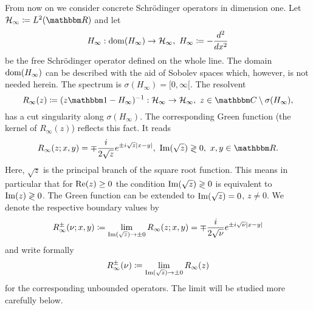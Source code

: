 From now on we consider concrete Schr\"odinger operators in dimension one.
Let $\hilbert_\infty\coloneqq L^2(\R)$ and let 
\begin{equation}\label{H_infinity}
  H_\infty:\operatorname{dom}(H_\infty)\to{\mathcal H}_\infty,\ H_\infty \coloneqq -\frac{d^2}{dx^2}
\end{equation}
be the free Schr\"odinger operator defined on the whole line. The domain $\operatorname{dom}(H_\infty)$ can be described
with the aid of Sobolev spaces which, however, is not needed herein.
The spectrum is $\sigma(H_\infty)=[0,\infty[$. The resolvent
\begin{equation}\label{R_infinity}
  R_\infty(z)\coloneqq(z\id - H_\infty)^{-1}:\hilbert_\infty\to\hilbert_\infty,\
  z\in\C\setminus\sigma(H_\infty) ,
\end{equation}
has a cut singularity along $\sigma(H_\infty)$.
The corresponding Green function (the kernel of $R_\infty(z)$) reflects this fact. It reads
\begin{equation}\label{green_infinity}
  R_\infty(z;x,y) =
   \mp \frac{i}{2\sqrt{z}} e^{\pm i\sqrt{z}|x-y|},\ \im(\sqrt{z})\gtrless 0,\ x,y\in\R .
\end{equation}
Here, $\sqrt{z}$ is the principal branch of the square root function. This means in particular that
for $\operatorname{Re}(z)\geq 0$ the condition $\operatorname{Im}(\sqrt{z})\gtrless0$ is equivalent to $\operatorname{Im}(z)\gtrless0$.
The Green function can be extended to $\operatorname{Im}(\sqrt{z})=0$, $z\neq 0$. We denote the respective boundary values by
\begin{equation}\label{R_boundary_values}
  R_\infty^\pm(\nu;x,y) \coloneqq \lim_{\operatorname{Im}(\sqrt{z})\to \pm 0} R_\infty(z;x,y)
                       = \mp \frac{i}{2\sqrt{\nu}} e^{\pm i\sqrt{\nu}|x-y|}
\end{equation}
and write formally
\begin{equation*}
  R_\infty^\pm(\nu) \coloneqq \lim_{\operatorname{Im}(\sqrt{z})\to \pm 0} R_\infty(z)
\end{equation*}
for the corresponding unbounded operators. The limit will be studied more carefully below.

